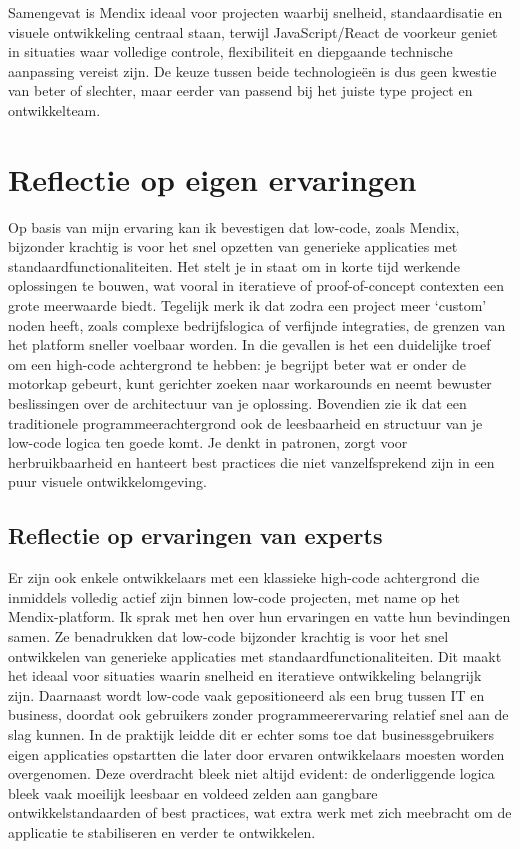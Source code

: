 Samengevat is Mendix ideaal voor projecten waarbij snelheid, standaardisatie en visuele ontwikkeling centraal staan, terwijl JavaScript/React de voorkeur geniet in situaties waar volledige controle, flexibiliteit en diepgaande technische aanpassing vereist zijn. De keuze tussen beide technologieën is dus geen kwestie van beter of slechter, maar eerder van passend bij het juiste type project en ontwikkelteam.


\section{Reflectie op eigen ervaringen}
Op basis van mijn ervaring kan ik bevestigen dat low-code, zoals Mendix, bijzonder krachtig is voor het snel opzetten van generieke applicaties met standaardfunctionaliteiten. Het stelt je in staat om in korte tijd werkende oplossingen te bouwen, wat vooral in iteratieve of proof-of-concept contexten een grote meerwaarde biedt. Tegelijk merk ik dat zodra een project meer ‘custom’ noden heeft, zoals complexe bedrijfslogica of verfijnde integraties, de grenzen van het platform sneller voelbaar worden. In die gevallen is het een duidelijke troef om een high-code achtergrond te hebben: je begrijpt beter wat er onder de motorkap gebeurt, kunt gerichter zoeken naar workarounds en neemt bewuster beslissingen over de architectuur van je oplossing. Bovendien zie ik dat een traditionele programmeerachtergrond ook de leesbaarheid en structuur van je low-code logica ten goede komt. Je denkt in patronen, zorgt voor herbruikbaarheid en hanteert best practices die niet vanzelfsprekend zijn in een puur visuele ontwikkelomgeving.

\subsection{Reflectie op ervaringen van experts}
Er zijn ook enkele ontwikkelaars met een klassieke high-code achtergrond die inmiddels volledig actief zijn binnen low-code projecten, met name op het Mendix-platform. Ik sprak met hen over hun ervaringen en vatte hun bevindingen samen. 
Ze benadrukken dat low-code bijzonder krachtig is voor het snel ontwikkelen van generieke applicaties met standaardfunctionaliteiten. Dit maakt het ideaal voor situaties waarin snelheid en iteratieve ontwikkeling belangrijk zijn. Daarnaast wordt low-code vaak gepositioneerd als een brug tussen IT en business, doordat ook gebruikers zonder programmeerervaring relatief snel aan de slag kunnen. In de praktijk leidde dit er echter soms toe dat businessgebruikers eigen applicaties opstartten die later door ervaren ontwikkelaars moesten worden overgenomen. Deze overdracht bleek niet altijd evident: de onderliggende logica bleek vaak moeilijk leesbaar en voldeed zelden aan gangbare ontwikkelstandaarden of best practices, wat extra werk met zich meebracht om de applicatie te stabiliseren en verder te ontwikkelen.

